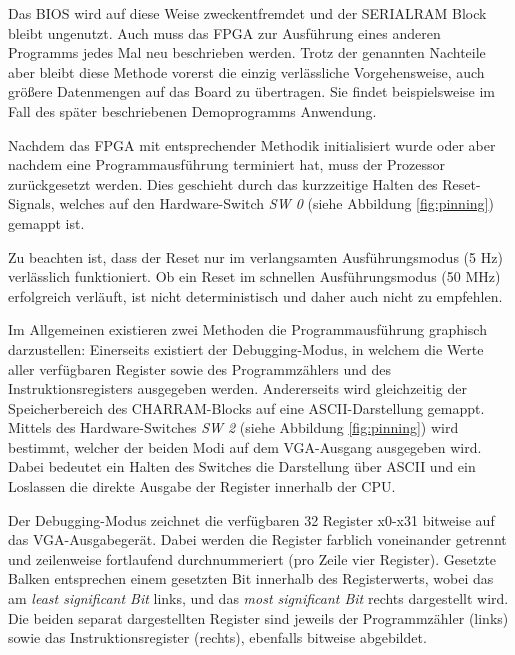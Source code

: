 Das BIOS wird auf diese Weise zweckentfremdet und der SERIALRAM Block bleibt ungenutzt. Auch muss das FPGA zur Ausf\"uhrung eines anderen Programms jedes Mal neu beschrieben werden. Trotz der genannten Nachteile aber bleibt diese Methode vorerst die einzig verl\"assliche Vorgehensweise, auch gr\"oßere Datenmengen auf das Board zu \"ubertragen. Sie findet beispielsweise im Fall des sp\"ater beschriebenen Demoprogramms Anwendung.


Nachdem das FPGA mit entsprechender Methodik initialisiert wurde oder aber nachdem eine Programmausf\"uhrung terminiert hat, muss der Prozessor zur\"uckgesetzt werden. Dies geschieht durch das kurzzeitige Halten des Reset-Signals, welches auf den Hardware-Switch \textit{SW 0} (siehe Abbildung \ref{fig:pinning}) gemappt ist.

Zu beachten ist, dass der Reset nur im verlangsamten Ausf\"uhrungsmodus (5 Hz) verl\"asslich funktioniert. Ob ein Reset im schnellen Ausf\"uhrungsmodus (50 MHz) erfolgreich verl\"auft, ist nicht deterministisch und daher auch nicht zu empfehlen.


Im Allgemeinen existieren zwei Methoden die Programmausf\"uhrung graphisch darzustellen: Einerseits existiert der Debugging-Modus, in welchem die Werte aller verf\"ugbaren Register sowie des Programmz\"ahlers und des Instruktionsregisters ausgegeben werden. Andererseits wird gleichzeitig der Speicherbereich des CHARRAM-Blocks auf eine ASCII-Darstellung gemappt. Mittels des Hardware-Switches \textit{SW 2} (siehe Abbildung \ref{fig:pinning}) wird bestimmt, welcher der beiden Modi auf dem VGA-Ausgang ausgegeben wird. Dabei bedeutet ein Halten des Switches die Darstellung \"uber ASCII und ein Loslassen die direkte Ausgabe der Register innerhalb der CPU.


Der Debugging-Modus zeichnet die verf\"ugbaren 32 Register x0-x31 bitweise auf das VGA-Ausgabeger\"at. Dabei werden die Register farblich voneinander getrennt und zeilenweise fortlaufend durchnummeriert (pro Zeile vier Register). Gesetzte Balken entsprechen einem gesetzten Bit innerhalb des Registerwerts, wobei das am \textit{least significant Bit} links, und das \textit{most significant Bit} rechts dargestellt wird.
Die beiden separat dargestellten Register sind jeweils der Programmz\"ahler (links) sowie das Instruktionsregister (rechts), ebenfalls bitweise abgebildet.

